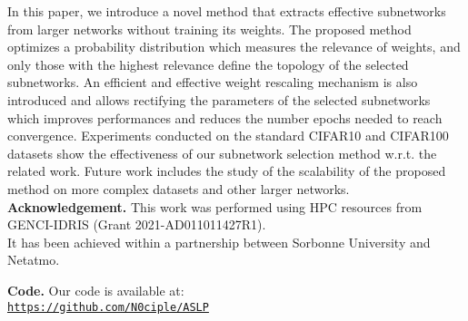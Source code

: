 In this paper, we introduce a novel method that extracts effective subnetworks
from larger networks without training its weights. The proposed method optimizes
a probability distribution which measures the relevance of weights, and only
those with the highest relevance define the topology of the selected
subnetworks. An efficient and effective weight rescaling mechanism is also
introduced and allows rectifying the parameters of the selected subnetworks
which improves performances and reduces the number epochs needed to reach
convergence. Experiments conducted on the standard CIFAR10 and  CIFAR100
datasets show the effectiveness of our subnetwork selection method w.r.t. the
related work. Future work includes the study of the scalability of the proposed
method on more complex datasets and other larger networks.\\

\noindent\textbf{Acknowledgement.} 
This work was performed using HPC resources from GENCI-IDRIS (Grant 2021-AD011011427R1). \\
It has been achieved within a partnership between Sorbonne University and Netatmo.

\noindent\textbf{Code.} Our code is available at:\\ \href{https://github.com/N0ciple/ASLP}{\texttt{https://github.com/N0ciple/ASLP}}

